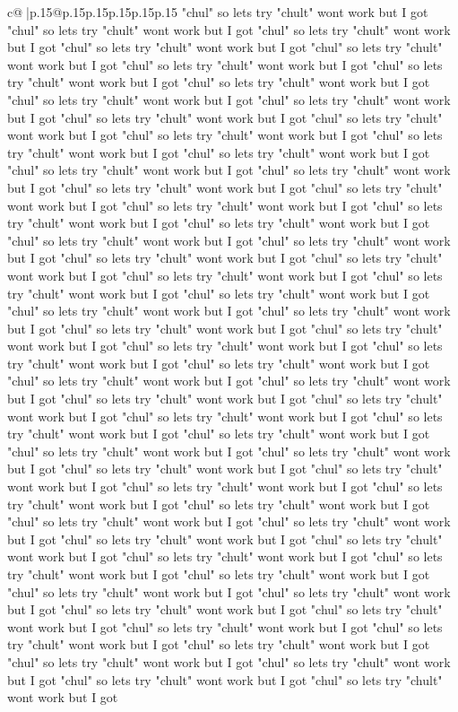 \documentclass{article}
\begin{document}
{\begin{supertabular}{c@{$\;$}|p{.15\linewidth}@{}p{.15\linewidth}p{.15\linewidth}p{.15\linewidth}p{.15\linewidth}p{.15\linewidth}}
{{{"chul" so lets try "chult" wont work but I got "chul" so lets try "chult" wont work but I got "chul" so lets try "chult" wont work but I got "chul" so lets try "chult" wont work but I got "chul" so lets try "chult" wont work but I got "chul" so lets try "chult" wont work but I got "chul" so lets try "chult" wont work but I got "chul" so lets try "chult" wont work but I got "chul" so lets try "chult" wont work but I got "chul" so lets try "chult" wont work but I got "chul" so lets try "chult" wont work but I got "chul" so lets try "chult" wont work but I got "chul" so lets try "chult" wont work but I got "chul" so lets try "chult" wont work but I got "chul" so lets try "chult" wont work but I got "chul" so lets try "chult" wont work but I got "chul" so lets try "chult" wont work but I got "chul" so lets try "chult" wont work but I got "chul" so lets try "chult" wont work but I got "chul" so lets try "chult" wont work but I got "chul" so lets try "chult" wont work but I got "chul" so lets try "chult" wont work but I got "chul" so lets try "chult" wont work but I got "chul" so lets try "chult" wont work but I got "chul" so lets try "chult" wont work but I got "chul" so lets try "chult" wont work but I got "chul" so lets try "chult" wont work but I got "chul" so lets try "chult" wont work but I got "chul" so lets try "chult" wont work but I got "chul" so lets try "chult" wont work but I got "chul" so lets try "chult" wont work but I got "chul" so lets try "chult" wont work but I got "chul" so lets try "chult" wont work but I got "chul" so lets try "chult" wont work but I got "chul" so lets try "chult" wont work but I got "chul" so lets try "chult" wont work but I got "chul" so lets try "chult" wont work but I got "chul" so lets try "chult" wont work but I got "chul" so lets try "chult" wont work but I got "chul" so lets try "chult" wont work but I got "chul" so lets try "chult" wont work but I got "chul" so lets try "chult" wont work but I got "chul" so lets try "chult" wont work but I got "chul" so lets try "chult" wont work but I got "chul" so lets try "chult" wont work but I got "chul" so lets try "chult" wont work but I got "chul" so lets try "chult" wont work but I got "chul" so lets try "chult" wont work but I got "chul" so lets try "chult" wont work but I got "chul" so lets try "chult" wont work but I got "chul" so lets try "chult" wont work but I got "chul" so lets try "chult" wont work but I got "chul" so lets try "chult" wont work but I got "chul" so lets try "chult" wont work but I got "chul" so lets try "chult" wont work but I got "chul" so lets try "chult" wont work but I got "chul" so lets try "chult" wont work but I got "chul" so lets try "chult" wont work but I got "chul" so lets try "chult" wont work but I got "chul" so lets try "chult" wont work but I got "chul" so lets try "chult" wont work but I got "chul" so lets try "chult" wont work but I got "chul" so lets try "chult" wont work but I got "chul" so lets try "chult" wont work but I got "chul" so lets try "chult" wont work but I got "chul" so lets try "chult" wont work but I got "chul" so lets try "chult" wont work but I got "chul" so lets try "chult" wont work but I got }}}
\end{supertabular}}
\end{document}
